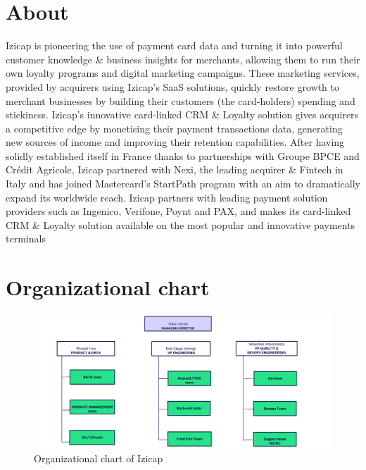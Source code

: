 

\section{About}
Izicap is pioneering the use of payment card data and turning it into powerful customer knowledge \& business
insights for merchants, allowing them to run their own loyalty programs and digital marketing campaigns. These
marketing services, provided by acquirers using Izicap’s SaaS solutions, quickly restore growth to merchant
businesses by building their customers (the card-holders) spending and stickiness. Izicap’s innovative card-linked
CRM \& Loyalty solution gives acquirers a competitive edge by monetising their payment transactions data,
generating new sources of income and improving their retention capabilities. After having solidly established itself in
France thanks to partnerships with Groupe BPCE and Crédit Agricole, Izicap partnered with Nexi, the leading
acquirer \& Fintech in Italy and has joined Mastercard’s StartPath program with an aim to dramatically expand its
worldwide reach. Izicap partners with leading payment solution providers such as Ingenico, Verifone, Poynt and PAX,
and makes its card-linked CRM \& Loyalty solution available on the most popular and innovative payments terminals

\newpage

\section{Organizational chart}
\begin{figure}[H]
\centering
\includegraphics[width=\linewidth]{images/orga.png}
\caption{Organizational chart of Izicap}\label{fig:organigmramme}
\end{figure}

